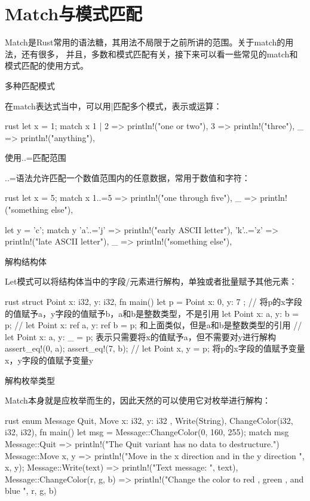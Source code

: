 \section{Match与模式匹配}
Match是Rust常用的语法糖，其用法不局限于之前所讲的范围。关于match的用法，还有很多，
并且，多数和模式匹配有关，接下来可以看一些常见的match和模式匹配的使用方式。
\begin{outline}[enumerate]
\1 多种匹配模式

在match表达式当中，可以用|匹配多个模式，表示或运算：
\begin{code-block}{rust}
let x = 1;
match x {
    1 | 2 => println!("one or two"),
    3 => println!("three"),
    _ => println!("anything"),
}
\end{code-block}

\1 使用..=匹配范围

..=语法允许匹配一个数值范围内的任意数据，常用于数值和字符：
\begin{code-block}{rust}
let x = 5;
match x {
    1..=5 => println!("one through five"),
    _ => println!("something else"),
}

let y = 'c';
match y {
    'a'..='j' => println!("early ASCII letter"),
    'k'..='z' => println!("late ASCII letter"),
    _ => println!("something else"),
}
\end{code-block}

\1 解构结构体

Let模式可以将结构体当中的字段/元素进行解构，单独或者批量赋予其他元素：
\begin{code-block}{rust}
struct Point {
    x: i32,
    y: i32,
}
fn main() {
    let p = Point { x: 0, y: 7 };
    // 将p的x字段的值赋予a，y字段的值赋予b，a和b是整数类型，不是引用
    let Point { x: a, y: b } = p;
    // let Point {x: ref a, y: ref b} = p; 和上面类似，但是a和b是整数类型的引用
    // let Point {x: a, y: _} = p; 表示只需要将x的值赋予a，但不需要对y进行解构
    assert_eq!(0, a);
    assert_eq!(7, b);
    // let Point {x, y} = p; 将p的x字段的值赋予变量x，y字段的值赋予变量y
}
\end{code-block}

\1 解构枚举类型

Match本身就是应枚举而生的，因此天然的可以使用它对枚举进行解构：
\begin{code-block}{rust}
enum Message {
    Quit,
    Move { x: i32, y: i32 },
    Write(String),
    ChangeColor(i32, i32, i32),
}
fn main() {
    let msg = Message::ChangeColor(0, 160, 255);
    match msg {
        Message::Quit => {
            println!("The Quit variant has no data to destructure.")
        }
        Message::Move { x, y } => {
            println!("Move in the x direction {} and in the y direction {}", x, y);
        }
        Message::Write(text) => println!("Text message: {}", text),
        Message::ChangeColor(r, g, b) => {
            println!("Change the color to red {}, green {}, and blue {}", r, g, b)
        }
    }
}
\end{code-block}


\end{outline}
